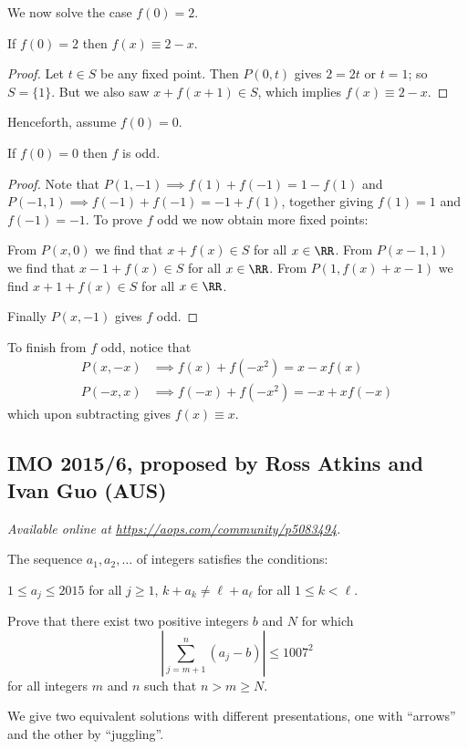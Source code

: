 \documentclass[11pt]{scrartcl}
\begin{document}
We now solve the case $f(0) = 2$.
\begin{claim*}
  If $f(0) = 2$ then $f(x) \equiv 2-x$.
\end{claim*}
\begin{proof}
  Let $t \in S$ be any fixed point.
  Then $P(0,t)$ gives $2 = 2t$ or $t = 1$;
  so $S = \{1\}$.
  But we also saw $x+f(x+1) \in S$,
  which implies $f(x) \equiv 2-x$.
\end{proof}

Henceforth, assume $f(0) = 0$.
\begin{claim*}
  If $f(0) = 0$ then $f$ is odd.
\end{claim*}
\begin{proof}
  Note that $P(1,-1) \implies f(1) + f(-1) = 1 - f(1)$
  and $P(-1,1) \implies f(-1) + f(-1) = -1 + f(1)$,
  together giving $f(1) = 1$ and $f(-1) = -1$.
  To prove $f$ odd we now obtain more fixed points:
  \begin{itemize}
    \ii From $P(x,0)$ we find that $x+f(x) \in S$ for all $x \in \RR$.
    \ii From $P(x-1,1)$ we find that $x-1+f(x) \in S$ for all $x \in \RR$.
    \ii From $P(1, f(x)+x-1)$ we find $x+1+f(x) \in S$ for all $x \in \RR$.
  \end{itemize}
  Finally $P(x, -1)$ gives $f$ odd.
\end{proof}
To finish from $f$ odd, notice that
\begin{align*}
  P(x,-x) &\implies f(x) + f(-x^2) = x - xf(x) \\
  P(-x,x) &\implies f(-x) + f(-x^2) = -x + xf(-x)
\end{align*}
which upon subtracting gives $f(x) \equiv x$.
\pagebreak

\subsection{IMO 2015/6, proposed by Ross Atkins and Ivan Guo (AUS)}
\textsl{Available online at \url{https://aops.com/community/p5083494}.}
\begin{mdframed}[style=mdpurplebox,frametitle={Problem statement}]
The sequence $a_1,a_2,\dots$ of integers satisfies the conditions:
\begin{enumerate}[(i)]
  \ii $1\le a_j\le2015$ for all $j\ge1$,
  \ii $k+a_k\neq \ell+a_\ell$ for all $1\le k<\ell$.
\end{enumerate}
Prove that there exist two positive integers $b$ and $N$ for which
\[ \left\lvert\sum_{j=m+1}^n (a_j-b) \right\rvert \le 1007^2 \]
for all integers $m$ and $n$ such that $n > m\ge N$.
\end{mdframed}
We give two equivalent solutions with different presentations,
one with ``arrows'' and the other by ``juggling''.
\end{document}
